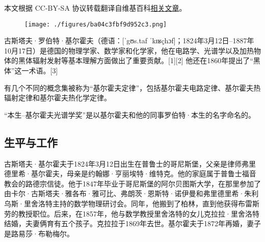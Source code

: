 
本文根据 CC-BY-SA 协议转载翻译自维基百科\href{https://en.wikipedia.org/wiki/Gustav_Kirchhoff}{相关文章}。

\begin{figure}[ht]
\centering
\texttt{[image: ./figures/ba04c3fbf9d952c3.png]}
\caption{} \label{fig_JRHF_1}
\end{figure}
古斯塔夫·罗伯特·基尔霍夫（德语：[ˈgʊs.taf ˈkɪʁçhɔf]；1824年3月12日–1887年10月17日）是德国的物理学家、数学家和化学家，他在电路学、光谱学以及加热物体的黑体辐射发射等基本理解方面做出了重要贡献。[1][2] 他还在1860年提出了“黑体”这一术语。[3]

有几个不同的概念集被称为“基尔霍夫定律”，包括基尔霍夫电路定律、基尔霍夫热辐射定律和基尔霍夫热化学定律。

“本生–基尔霍夫光谱学奖”是以基尔霍夫和他的同事罗伯特·本生的名字命名的。
\subsection{生平与工作}  
古斯塔夫·基尔霍夫于1824年3月12日出生在普鲁士的哥尼斯堡，父亲是律师弗里德里希·基尔霍夫，母亲是约翰娜·亨丽埃特·维特克。他的家庭属于普鲁士福音教会的路德宗信徒。他于1847年毕业于哥尼斯堡的阿尔贝图斯大学，在那里参加了由卡尔·古斯塔夫·雅各布·雅可比、弗朗茨·恩斯特·诺伊曼和弗里德里希·朱利乌斯·里舍洛特主持的数学物理研讨会。同年，他搬到了柏林，直到他获得布雷斯劳的教授职位。后来，在1857年，他与数学教授里舍洛特的女儿克拉拉·里舍洛特结婚，夫妻俩育有五个孩子。克拉拉于1869年去世。基尔霍夫于1872年再婚，妻子是路易莎·布勒梅尔。